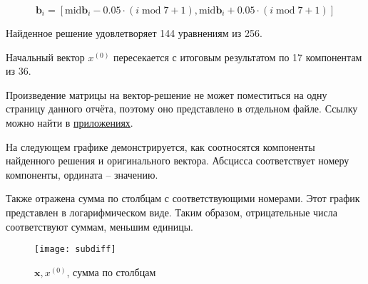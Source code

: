 \begin{equation}
\mathbf{b}_i = [\mathrm{mid} \mathbf{b}_i - 0.05 \cdot (i \; \mathrm{mod} \; 7 + 1),
\mathrm{mid} \mathbf{b}_i + 0.05 \cdot (i \; \mathrm{mod} \; 7 + 1)]
\end{equation}

Найденное решение удовлетворяет 144 уравнениям из 256.

Начальный вектор $x^{(0)}$ пересекается с итоговым результатом по 17 компонентам из 36.

Произведение матрицы на вектор-решение не может поместиться на одну страницу данного отчёта, поэтому оно представлено в отдельном файле. Ссылку можно найти в \hyperref[app]{приложениях}.

На следующем графике демонстрируется, как соотносятся компоненты найденного решения и оригинального вектора. Абсцисса соответствует номеру компоненты, ордината -- значению.

Также отражена сумма по столбцам с соответствующими номерами. Этот график представлен в логарифмическом виде. Таким образом, отрицательные числа соответствуют суммам, меньшим единицы.

\begin{figure}[H]
	\begin{center}
		\texttt{[image: subdiff]}
		\caption{$\mathbf{x}, x^{(0)}$, сумма по столбцам}
	\end{center}
\end{figure}